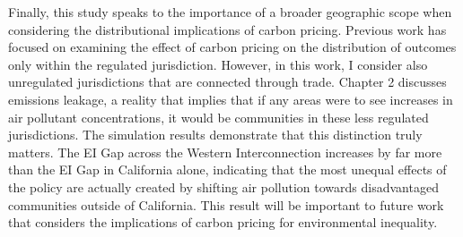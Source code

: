 Finally, this study speaks to the importance of a broader geographic scope when considering the distributional implications of carbon pricing. Previous work has focused on examining the effect of carbon pricing on the distribution of outcomes only within the regulated jurisdiction. However, in this work, I consider also unregulated jurisdictions that are connected through trade. Chapter 2 discusses emissions leakage, a reality that implies that if any areas were to see increases in air pollutant concentrations, it would be communities in these less regulated jurisdictions. The simulation results demonstrate that this distinction truly matters. The EI Gap across the Western Interconnection increases by far more than the EI Gap in California alone, indicating that the most unequal effects of the policy are actually created by shifting air pollution towards disadvantaged communities outside of California. This result will be important to future work that considers the implications of carbon pricing for environmental inequality. 





